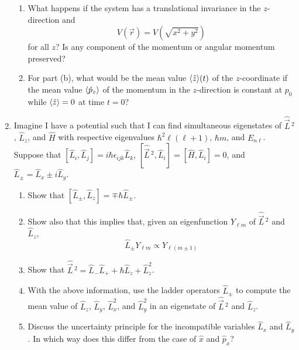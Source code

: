 \documentclass[../psets.tex]{subfiles}
\begin{document}
\begin{enumerate}
\begin{enumerate}
        \item What happens if the system has a translational invariance in the $z$-direction and
        \begin{equation}
            V(\vec{r}) = V(\sqrt{x^2+y^2})
        \end{equation}
        for all $z$? Is any component of the momentum or angular momentum preserved?
        \item For part (b), what would be the mean value $\langle{\hat{z}}\rangle(t)$ of the $z$-coordinate if the mean value $\langle{\hat{p}_z}\rangle$ of the momentum in the $z$-direction is constant at $p_0$ while $\langle{\hat{z}}\rangle=0$ at time $t=0$?
    \end{enumerate}
    \item Imagine I have a potential such that I can find simultaneous eigenstates of $\hat{\vec{L}}{\,}^2$, $\hat{L}_z$, and $\hat{H}$ with respective eigenvalues $\hbar^2\ell(\ell+1)$, $\hbar m$, and $E_{n\ell}$. Suppose that $[\hat{L}_i,\hat{L}_j]=i\hbar\epsilon_{ijk}\hat{L}_k$, $[\hat{\vec{L}}{\,}^2,\hat{L}_i]=[\hat{H},\hat{L}_i]=0$, and $\hat{L}_\pm=\hat{L}_x\pm i\hat{L}_y$.
    \begin{enumerate}
        \item Show that $[\hat{L}_\pm,\hat{L}_z]=\mp\hbar\hat{L}_\pm$.
        \item Show also that this implies that, given an eigenfunction $Y_{\ell m}$ of $\hat{\vec{L}}{\,}^2$ and $\hat{L}_z$,
        \begin{equation}
            \hat{L}_\pm Y_{\ell m} \propto Y_{\ell(m\pm 1)}
        \end{equation}
        \item Show that $\hat{\vec{L}}{\,}^2=\hat{L}_-\hat{L}_++\hbar\hat{L}_z+\hat{L}_z^2$.
        \item With the above information, use the ladder operators $\hat{L}_\pm$ to compute the mean value of $\hat{L}_z$, $\hat{L}_y$, $\hat{L}_x^2$, and $\hat{L}_y^2$ in an eigenstate of $\hat{\vec{L}}{\,}^2$ and $\hat{L}_z$.
        \item Discuss the uncertainty principle for the incompatible variables $\hat{L}_x$ and $\hat{L}_y$. In which way does this differ from the case of $\hat{x}$ and $\hat{p}_x$?
    \end{enumerate}
\end{enumerate}
\end{document}
